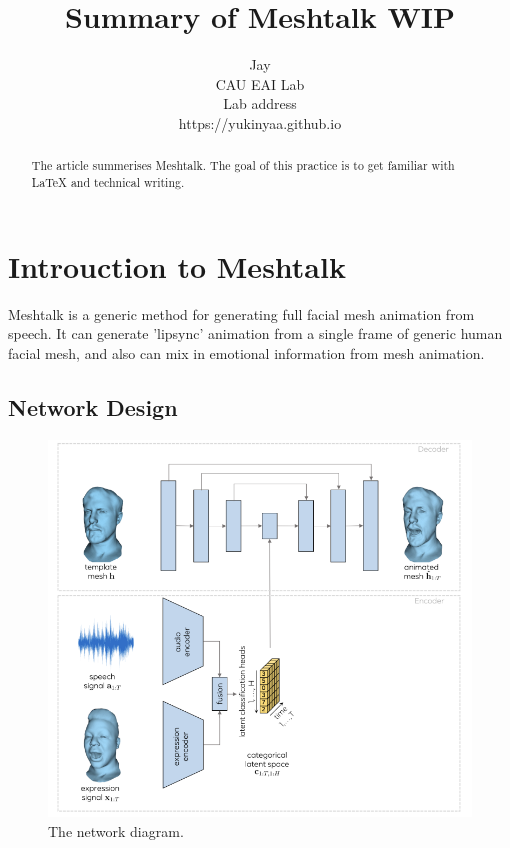 \documentclass[10pt,twocolumn,letterpaper]{article}
\begin{document}
  \title{Summary of Meshtalk WIP}

  \author{Jay\\
    CAU EAI Lab\\
    Lab address\\
    {https://yukinyaa.github.io}
  }
  \maketitle
  \thispagestyle{empty}

  \begin{abstract}
    The article summerises Meshtalk\cite{richard2021meshtalk}.
    The goal of this practice is to get familiar with \LaTeX{} and technical writing.
  \end{abstract}


  \section{Introuction to Meshtalk}
    Meshtalk is a generic method for generating full facial mesh animation from speech. It can generate 'lipsync' animation from a single frame of generic human facial mesh, and also can mix in emotional information from mesh animation.

    \subsection{Network Design}


      \begin{figure}[t]
        \begin{center}
        \includegraphics[width=0.8\linewidth]{meshtalk_overview.png}
        \end{center}
        \caption{The network diagram\cite{richard2021meshtalk}.}
        \label{fig:long}
        \label{fig:networkdiag}
      \end{figure}
\end{document}
